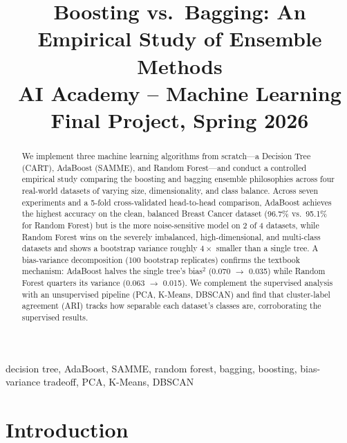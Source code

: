 \documentclass[conference]{IEEEtran}
\begin{document}
\title{Boosting vs.\ Bagging: An Empirical Study of Ensemble Methods\\
{\footnotesize AI Academy -- Machine Learning Final Project, Spring 2026}}

\author{
  \and
  \and
}

\maketitle

\begin{abstract}
We implement three machine learning algorithms from scratch---a Decision Tree (CART),
AdaBoost (SAMME), and Random Forest---and conduct a controlled empirical study
comparing the boosting and bagging ensemble philosophies across four real-world datasets
of varying size, dimensionality, and class balance. Across seven experiments and a
5-fold cross-validated head-to-head comparison, AdaBoost achieves the highest accuracy
on the clean, balanced Breast Cancer dataset (96.7\% vs.\ 95.1\% for Random Forest) but
is the more noise-sensitive model on 2 of 4 datasets, while Random Forest wins on the
severely imbalanced, high-dimensional, and multi-class datasets and shows a
bootstrap variance roughly $4\times$ smaller than a single tree. A bias-variance
decomposition (100 bootstrap replicates) confirms the textbook mechanism: AdaBoost
halves the single tree's bias$^2$ (0.070 $\to$ 0.035) while Random Forest quarters its
variance (0.063 $\to$ 0.015). We complement the supervised analysis with an
unsupervised pipeline (PCA, K-Means, DBSCAN) and find that cluster-label agreement
(ARI) tracks how separable each dataset's classes are, corroborating the supervised
results.
\end{abstract}

\begin{IEEEkeywords}
decision tree, AdaBoost, SAMME, random forest, bagging, boosting, bias-variance
tradeoff, PCA, K-Means, DBSCAN
\end{IEEEkeywords}

\section{Introduction}
\label{sec:intro}
\end{document}
